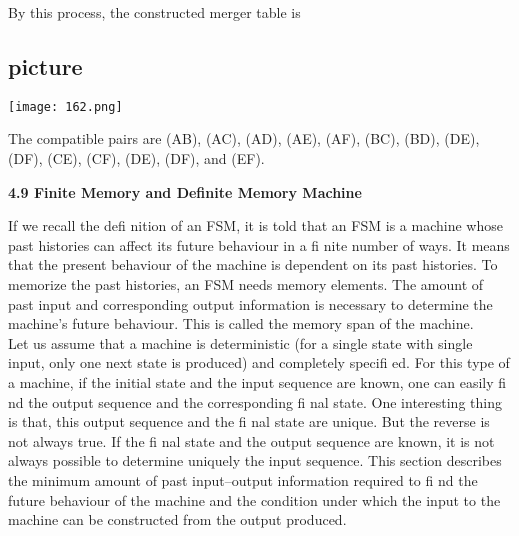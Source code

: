 \documentclass[10pt]{article}
\begin{document}
By this process, the constructed merger table is\\

\vspace*{0.1cm}
\begin{center}
\section{picture}
\texttt{[image: 162.png]}
\end{center}

\vspace*{0.1cm}
\hspace*{0.5cm} The compatible pairs are (AB), (AC), (AD), (AE), (AF), (BC), (BD), (DE), (DF), (CE), (CF), (DE),
(DF), and (EF).\\

\vspace*{0.5cm}

\large{
\textbf{4.9 Finite Memory and Definite Memory Machine} \\
}

\vspace*{0.1cm}

If we recall the defi nition of an FSM, it is told that an FSM is a machine whose past histories can affect
its future behaviour in a fi nite number of ways. It means that the present behaviour of the machine is
dependent on its past histories. To memorize the past histories, an FSM needs memory elements. The
amount of past input and corresponding output information is necessary to determine the machine’s
future behaviour. This is called the memory span of the machine.\\
\hspace*{0.5cm} Let us assume that a machine is deterministic (for a single state with single input, only one next
state is produced) and completely specifi ed. For this type of a machine, if the initial state and the
input sequence are known, one can easily fi nd the output sequence and the corresponding fi nal state.
One interesting thing is that, this output sequence and the fi nal state are unique. But the reverse is not
always true. If the fi nal state and the output sequence are known, it is not always possible to determine
uniquely the input sequence. This section describes the minimum amount of past input–output information
required to fi nd the future behaviour of the machine and the condition under which the input to the
machine can be constructed from the output produced.\\
\end{document}
